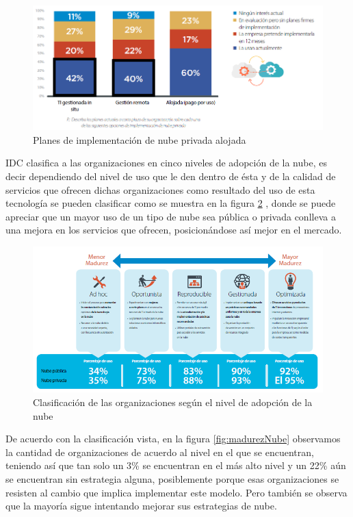 \documentclass[a4paper, 12pt]{report}
\begin{document}
\begin{justify}
\begin{figure}[ht]
	\begin{center}
		\includegraphics[width=.8\textwidth]{planesImplementacionNube}
		\caption{Planes de implementaci\'on de nube privada alojada}
		\label{fig:planesImplementacionNube}
	\end{center}
\end{figure}

IDC clasifica a las organizaciones en cinco niveles de adopci\'on de la nube, es decir dependiendo del nivel de uso que le den dentro de \'esta y de la calidad de servicios que ofrecen dichas organizaciones como resultado del uso de esta tecnolog\'ia se pueden clasificar como se muestra en la figura \ref{fig:clasificacionOrganizaciones} , donde se puede apreciar que un mayor uso de un tipo de nube sea p\'ublica o privada conlleva a una mejora en los servicios que ofrecen, posicion\'andose as\'i mejor en el mercado.\par

\begin{figure}[ht]
	\begin{center}
		\includegraphics[width=.8\textwidth]{clasificacionOrganizaciones}
		\caption{Clasificaci\'on de las organizaciones seg\'un el nivel de adopci\'on de la nube}
		\label{fig:clasificacionOrganizaciones}
	\end{center}
\end{figure}

De acuerdo con la clasificaci\'on vista, en la figura \ref{fig:madurezNube} observamos la cantidad de organizaciones de acuerdo al nivel en el que se encuentran, teniendo as\'i que tan solo un 3\% se encuentran en el m\'as alto nivel y un 22\% a\'un se encuentran sin estrategia alguna, posiblemente porque esas organizaciones se resisten al cambio que implica implementar este modelo. Pero tambi\'en se observa que la mayor\'ia sigue intentando mejorar sus estrategias de nube.\par


\end{justify}
\end{document}
